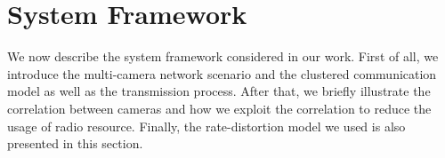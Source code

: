 \section{System Framework}
\label{sec::framework}
We now describe the system framework considered in our work.
First of all, we introduce the multi-camera network scenario and the clustered
communication model as well as the transmission process.
After that, we briefly illustrate the correlation between cameras and how we
exploit the correlation to reduce the usage of radio resource.
Finally, the rate-distortion model we used is also presented in this section.



